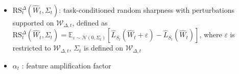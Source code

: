 \documentclass{article}
\begin{document}
\begin{itemize}



\item $\mathrm{RS}_t^\Delta(\widehat W_t,\Sigma_t)$: task-conditioned random sharpness with perturbations supported on $\mathcal W_{\Delta,t}$, defined as
$\mathrm{RS}_t^\Delta(\widehat W_t,\Sigma_t)=\mathbb E_{\varepsilon\sim\mathcal N(0,\Sigma_t)}[\hat L_{S_t}(\widehat W_t+\varepsilon)-\hat L_{S_t}(\widehat W_t)]$,
where $\varepsilon$ is restricted to $\mathcal W_{\Delta,t}$, $\Sigma_t$ is defined on $\mathcal{W}_{\Delta,t}$




\item $\alpha_t$ : feature amplification factor



\end{itemize}
\end{document}
